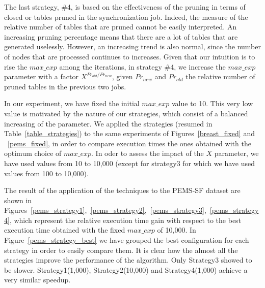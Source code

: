 The last strategy, \#4, is based on the effectiveness of the pruning in terms of closed or tables pruned in the synchronization job. Indeed, the measure of the relative number of tables that are pruned cannot be easily interpreted. An increasing pruning percentage means that there are a lot of tables that are generated uselessly. However, an increasing trend is also normal, since the number of nodes that are processed continues to increases. Given that our intuition is to rise the  $max\_exp$ among the iterations, in strategy \#4, we increase the $max\_exp$ parameter with a factor $X^{Pr_{old} / Pr_{new}}$, given $Pr_{new}$ and  $Pr_{old}$ the relative number of pruned tables in the previous two jobs. 

In our experiment, we have fixed the initial  $max\_exp$ value to 10. This very low value is motivated by the nature of our strategies, which consist of a balanced increasing of the parameter.
We applied the strategies (resumed in Table~\ref{table_strategies}) to the same experiments of Figures~\ref{breast_fixed} and ~\ref{pems_fixed}, in order to compare execution times the ones obtained with the optimum choice of $max\_exp$. 
In oder to assess the impact of the $X$ parameter, we have used values from 10 to 10,000 (except for strategy3 for which we have used values from 100 to 10,000).

The result of the application of the techniques to the PEMS-SF dataset are shown in Figures~\ref{pems_strategy1},~\ref{pems_strategy2},~\ref{pems_strategy3},~\ref{pems_strategy4}, which represent the relative execution time gain with respect to the best execution time obtained with the fixed $max\_exp$ of 10,000. In Figure~\ref{pems_strategy_best} we have grouped the best configuration for each strategy in order to easily compare them.
It is clear how the almost all the strategies improve the performance of the algorithm. Only Strategy3 showed to be slower. Strategy1(1,000), Strategy2(10,000) and Strategy4(1,000) achieve a very similar speedup. 

